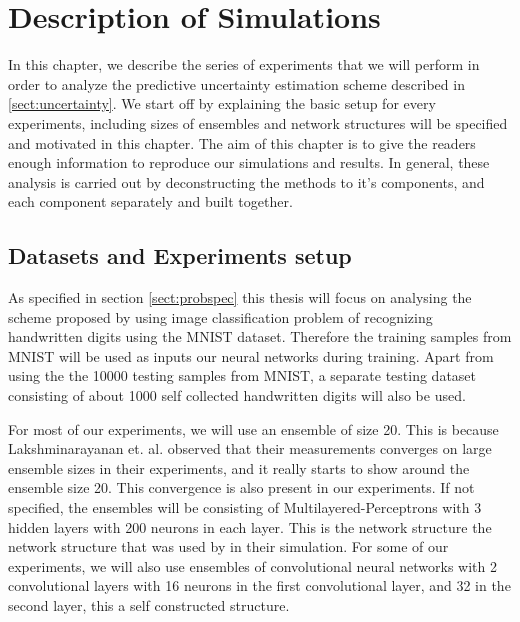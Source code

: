 \chapter{Description of Simulations}

In this chapter, we describe the series of experiments that we will perform in order to analyze the predictive uncertainty estimation scheme described in \ref{sect:uncertainty}. We start off by explaining the basic setup for every experiments, including sizes of ensembles and network structures will be specified and motivated in this chapter. The aim of this chapter is to give the readers enough information to reproduce our simulations and results. In general, these analysis is carried out by deconstructing the methods to it's components, and each component separately and built together.

\section{Datasets and Experiments setup}

As specified in section \ref{sect:probspec} this thesis will focus on analysing the scheme proposed by \cite{lakshminarayanan2017simple} using image classification problem of recognizing handwritten digits using the MNIST dataset. Therefore the training samples from MNIST will be used as inputs our neural networks during training. Apart from using the the 10000 testing samples from MNIST, a separate testing dataset consisting of about 1000 self collected handwritten digits will also be used. 

For most of our experiments, we will use an ensemble of size 20. This is because Lakshminarayanan et. al. \cite{lakshminarayanan2017simple} observed that their measurements converges on large ensemble sizes in their experiments, and it really starts to show around the ensemble size 20. This convergence is also present in our experiments. If not specified, the ensembles will be consisting of Multilayered-Perceptrons with 3 hidden layers with 200 neurons in each layer. This is the network structure the network structure that was used by \cite{lakshminarayanan2017simple} in their simulation. For some of our experiments, we will also use ensembles of convolutional neural networks with 2 convolutional layers with 16 neurons in the first convolutional layer, and 32 in the second layer, this a self constructed structure. 

